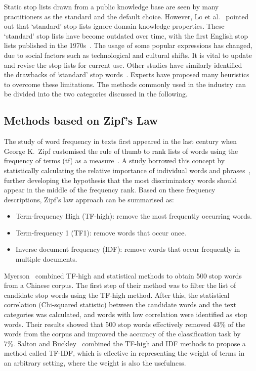 \documentclass[conference]{IEEEtran}
\begin{document}
\begin{sloppy}
Static stop lists drawn from a public knowledge base are seen by many practitioners as the standard and the default choice. However, Lo et al.~\cite{lo2005automatically} pointed out that `standard' stop lists ignore domain knowledge properties. These `standard' stop lists have become outdated over time, with the first English stop lists published in the 1970s~\cite{van1979information}. The usage of some popular expressions has changed, due to social factors such as technological and cultural shifts. It is vital to update and revise the stop lists for current use. Other studies have similarly identified the drawbacks of `standard' stop words~\cite{chakrabarti1997using, silva2003importance}. Experts have proposed many heuristics to overcome these limitations. The methods commonly used in the industry can be divided into the two categories discussed in the following.
 
\subsection{Methods based on Zipf's Law}
 
The study of word frequency in texts first appeared in the last century when George K.~Zipf customised the rule of thumb to rank lists of words using the frequency of terms (tf) as a measure~\cite{zipf1949selective}. A study borrowed this concept by statistically calculating the relative importance of individual words and phrases~\cite{luhn1957statistical}, further developing the hypothesis that the most discriminatory words should appear in the middle of the frequency rank. Based on these frequency descriptions, Zipf's law approach can be summarised as: 

\begin{itemize}
\item Term-frequency High (TF-high): remove the most frequently occurring words.  
\item Term-frequency 1 (TF1): remove words that occur once.  
\item Inverse document frequency (IDF): remove words that occur frequently in multiple documents. 
\end{itemize}
 
Myerson~\cite{myerson2013fundamentals} combined TF-high and statistical methods to obtain 500 stop words from a Chinese corpus. The first step of their method was to filter the list of candidate stop words using the TF-high method. After this, the statistical correlation (Chi-squared statistic) between the candidate words and the text categories was calculated, and words with low correlation were identified as stop words. Their results showed that 500 stop words effectively removed 43\% of the words from the corpus and improved the accuracy of the classification task by 7\%. Salton and Buckley~\cite{salton1988term} combined the TF-high and IDF methods to propose a method called TF-IDF, which is effective in representing the weight of terms in an arbitrary setting, where the weight is also the usefulness. 
 

\end{sloppy}
\end{document}
